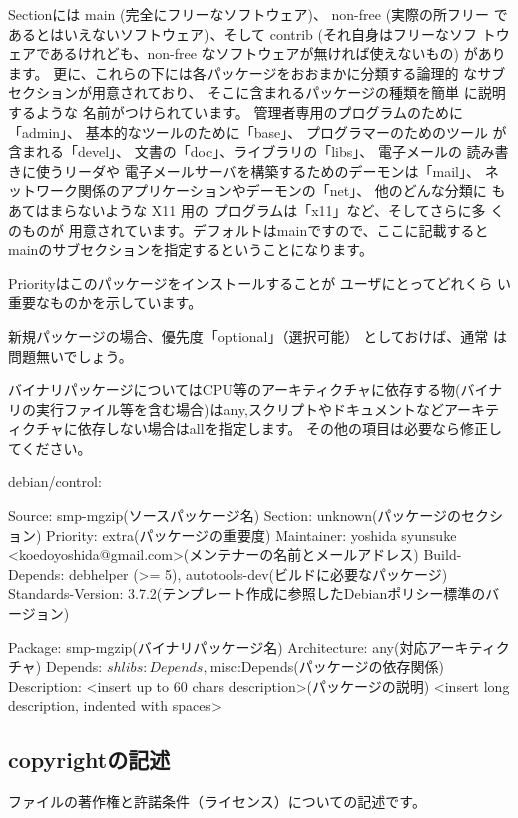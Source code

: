 \documentclass[mingoth,a4paper]{jsarticle}
\begin{document}
Sectionには main (完全にフリーなソフトウェア)、 non-free (実際の所フリー
であるとはいえないソフトウェア)、そして contrib (それ自身はフリーなソフ
トウェアであるけれども、non-free なソフトウェアが無ければ使えないもの)
があります。 更に、これらの下には各パッケージをおおまかに分類する論理的
なサブセクションが用意されており、 そこに含まれるパッケージの種類を簡単
に説明するような 名前がつけられています。 管理者専用のプログラムのために
「admin」、 基本的なツールのために「base」、 プログラマーのためのツール
が含まれる「devel」、 文書の「doc」、ライブラリの「libs」、 電子メールの
読み書きに使うリーダや 電子メールサーバを構築するためのデーモンは「mail」、
ネットワーク関係のアプリケーションやデーモンの「net」、 他のどんな分類に
もあてはまらないような X11 用の プログラムは「x11」など、そしてさらに多
くのものが 用意されています。デフォルトはmainですので、ここに記載すると
mainのサブセクションを指定するということになります。

Priorityはこのパッケージをインストールすることが ユーザにとってどれくら
い重要なものかを示しています。

新規パッケージの場合、優先度「optional」（選択可能） としておけば、通常
は問題無いでしょう。

バイナリパッケージについてはCPU等のアーキティクチャに依存する物(バイナリの実行ファイル等を含む場合)はany,スクリプトやドキュメントなどアーキティクチャに依存しない場合はallを指定します。
その他の項目は必要なら修正してください。

debian/control:
\begin{commandline}
Source: smp-mgzip(ソースパッケージ名)
Section: unknown(パッケージのセクション)
Priority: extra(パッケージの重要度)
Maintainer: yoshida syunsuke <koedoyoshida@gmail.com>(メンテナーの名前とメールアドレス)
Build-Depends: debhelper (>= 5), autotools-dev(ビルドに必要なパッケージ)
Standards-Version: 3.7.2(テンプレート作成に参照したDebianポリシー標準のバージョン)

Package: smp-mgzip(バイナリパッケージ名)
Architecture: any(対応アーキティクチャ)
Depends: ${shlibs:Depends}, ${misc:Depends}(パッケージの依存関係)
Description: <insert up to 60 chars description>(パッケージの説明)
 <insert long description, indented with spaces>
\end{commandline}

\subsection{copyrightの記述}

ファイルの著作権と許諾条件（ライセンス）についての記述です。
\end{document}
